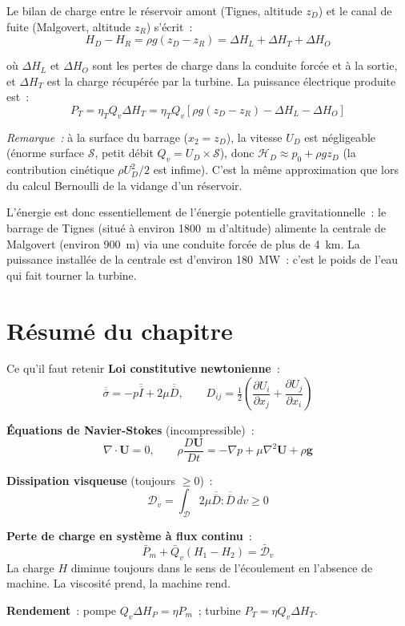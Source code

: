 \documentclass[11pt,a4paper]{report}
\newcommand{\DD}[1]{\dfrac{D #1}{Dt}}
\newcommand{\pd}[2]{\dfrac{\partial #1}{\partial #2}}
\newcommand{\ten}[1]{\overline{\overline{#1}}}   %
\begin{document}
Le bilan de charge entre le réservoir amont (Tignes, altitude $z_D$) et le canal de
fuite (Malgovert, altitude $z_R$) s'écrit~:
\[
    H_D - H_R = \rho g(z_D - z_R) = \Delta H_L + \Delta H_T + \Delta H_O
\]

où $\Delta H_L$ et $\Delta H_O$ sont les pertes de charge dans la conduite forcée
et à la sortie, et $\Delta H_T$ est la charge récupérée par la turbine. La puissance
électrique produite est~:
\[
    P_T = \eta_T Q_v \Delta H_T = \eta_T Q_v\left[\rho g(z_D-z_R) - \Delta H_L - \Delta H_O\right]
\]

\textit{Remarque~:} à la surface du barrage ($x_2=z_D$), la vitesse $U_D$ est
négligeable (énorme surface $\mathcal{S}$, petit débit $Q_v=U_D\times\mathcal{S}$),
donc $\mathcal{H}_D\approx p_0+\rho g z_D$ (la contribution cinétique $\rho U_D^2/2$
est infime). C'est la même approximation que lors du calcul Bernoulli de la
vidange d'un réservoir.

L'énergie est donc essentiellement de l'énergie potentielle gravitationnelle~:
le barrage de Tignes (situé à environ 1800~m d'altitude) alimente la centrale
de Malgovert (environ 900~m) via une conduite forcée de plus de 4~km.
La puissance installée de la centrale est d'environ 180~MW~: c'est le poids de
l'eau qui fait tourner la turbine.

\section*{Résumé du chapitre}

\begin{importantbox}{Ce qu'il faut retenir}
\textbf{Loi constitutive newtonienne}~:
\[
    \ten{\sigma} = -p\ten{I} + 2\mu\ten{D},
    \qquad
    D_{ij} = \tfrac{1}{2}\!\left(\pd{U_i}{x_j}+\pd{U_j}{x_i}\right)
\]

\vspace{4pt}
\textbf{Équations de Navier-Stokes} (incompressible)~:
\[
    \nabla\cdot\bm{U}=0,
    \qquad
    \rho\DD{\bm{U}} = -\nabla p + \mu\nabla^2\bm{U} + \rho\bm{g}
\]

\vspace{4pt}
\textbf{Dissipation visqueuse} (toujours $\geq 0$)~:
\[
    \mathcal{D}_v = \int_{\mathcal{D}}2\mu\ten{D}:\ten{D}\,dv \geq 0
\]

\vspace{4pt}
\textbf{Perte de charge en système à flux continu}~:
\[
    \bar{P}_m + \bar{Q}_v(H_1-H_2) = \bar{\mathcal{D}}_v
\]
La charge $H$ diminue toujours dans le sens de l'écoulement en l'absence
de machine. La viscosité prend, la machine rend.

\vspace{4pt}
\textbf{Rendement}~: pompe $Q_v\Delta H_P = \eta P_m$~;
turbine $P_T = \eta Q_v \Delta H_T$.
\end{importantbox}
\end{document}
